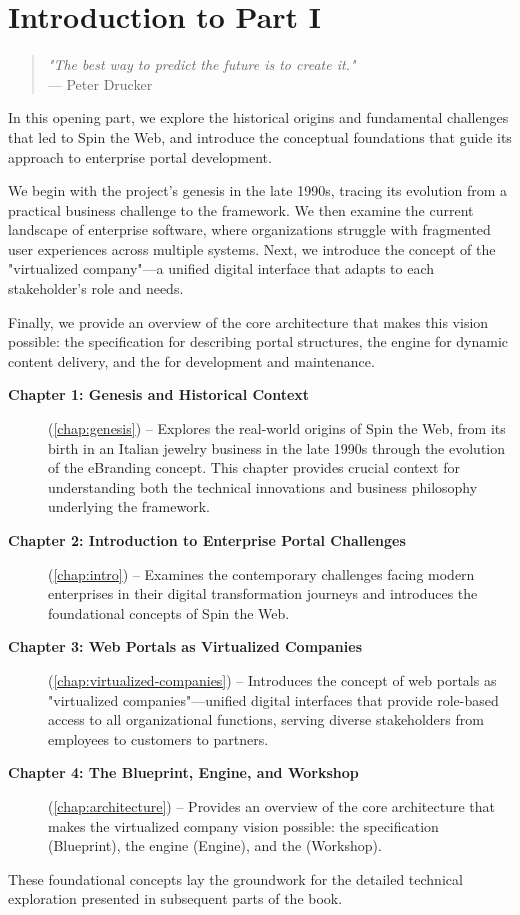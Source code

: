 
\chapter*{Introduction to Part I}
\label{part:foundations}

\begin{quote}
\textit{"The best way to predict the future is to create it."} \\
— Peter Drucker
\end{quote}

In this opening part, we explore the historical origins and fundamental challenges that led to Spin the Web, and introduce the conceptual foundations that guide its approach to enterprise portal development.

We begin with the project's genesis in the late 1990s, tracing its evolution from a practical business challenge to the framework. We then examine the current landscape of enterprise software, where organizations struggle with fragmented user experiences across multiple systems. Next, we introduce the concept of the "virtualized company"—a unified digital interface that adapts to each stakeholder's role and needs.

Finally, we provide an overview of the core architecture that makes this vision possible: the \wbdl{} specification for describing portal structures, the \webspinner{} engine for dynamic content delivery, and the \studio{} for development and maintenance.

\begin{description}
\item[\textbf{Chapter 1: Genesis and Historical Context}] (\cref{chap:genesis}) -- Explores the real-world origins of Spin the Web, from its birth in an Italian jewelry business in the late 1990s through the evolution of the eBranding concept. This chapter provides crucial context for understanding both the technical innovations and business philosophy underlying the framework.

\item[\textbf{Chapter 2: Introduction to Enterprise Portal Challenges}] (\cref{chap:intro}) -- Examines the contemporary challenges facing modern enterprises in their digital transformation journeys and introduces the foundational concepts of Spin the Web.

\item[\textbf{Chapter 3: Web Portals as Virtualized Companies}] (\cref{chap:virtualized-companies}) -- Introduces the concept of web portals as "virtualized companies"—unified digital interfaces that provide role-based access to all organizational functions, serving diverse stakeholders from employees to customers to partners.

\item[\textbf{Chapter 4: The Blueprint, Engine, and Workshop}] (\cref{chap:architecture}) -- Provides an overview of the core architecture that makes the virtualized company vision possible: the \wbdl{} specification (Blueprint), the \webspinner{} engine (Engine), and the \studio{} (Workshop).
\end{description}

These foundational concepts lay the groundwork for the detailed technical exploration presented in subsequent parts of the book.
